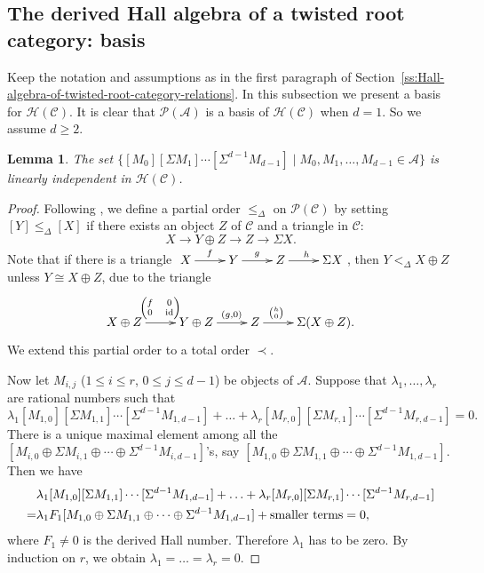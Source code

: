 \documentclass[reqno,12pt,a4paper]{amsart}
\newtheorem{lemma}[theorem]{Lemma}
\theoremstyle{remark}
\theoremstyle{definition}
\newcommand{\ca}{{\mathcal A}}
\newcommand{\cc}{{\mathcal C}}
\newcommand{\ch}{{\mathcal H}}
\newcommand{\cp}{{\mathcal P}}
\numberwithin{equation}{section}
\begin{document}
\subsection{The derived Hall algebra of a twisted root category: basis}
\label{ss:Hall-algebra-of-twisted-root-category-basis}
Keep the notation and assumptions as in the first paragraph of Section~\ref{ss:Hall-algebra-of-twisted-root-category-relations}.
In this subsection we present a basis for $\ch(\cc)$. It is clear that $\cp(\ca)$ is a basis of $\ch(\cc)$ when $d=1$. So we assume $d\geq 2$.

\begin{lemma}
\label{lemma-Hall-alg-basis-1}
The set $\{[M_0][\Sigma M_1] \cdots [\Sigma^{d-1} M_{d-1}]\mid M_0,M_1,\ldots,M_{d-1}\in\ca\}$ is linearly independent in $\ch(\cc)$.
\end{lemma}
\begin{proof} Following \cite{JensenSuZimmermann05}, we define a partial order $\leq_{\Delta}$ on $\mathcal{P(C)}$ by setting $[Y]\leq_{\Delta}[X]$ if there exists an object $Z$ of $\mathcal{C}$ and a triangle in $\mathcal{C}$:
\[X\rightarrow Y\oplus Z \rightarrow Z\rightarrow \Sigma X. \]
Note that if there is a triangle $\xymatrix@R=0.7pc{X\ar[r]^f & Y\ar[r]^g & Z\ar[r]^h & \Sigma X}$, then $Y<_{\Delta} X\oplus Z$ unless $Y\cong X\oplus Z$, due to the triangle
\[
\xymatrix{
X\oplus Z\ar[r]^{{\scriptsize\begin{pmatrix}f & 0\\ 0 & \mathrm{id}\end{pmatrix}}} & Y\oplus Z \ar[r]^(0.6){(g,0)} & Z\ar[r]^(0.3){{h\choose 0}} & \Sigma(X\oplus Z).
}
\]
We extend this partial order to a total order $\prec$.

Now let $M_{i,j}$ ($1\leq i\leq r$, $0\leq j\leq d-1$) be objects of $\mathcal{A}$. Suppose that $\lambda_1,\ldots, \lambda_r$ are rational numbers such that
\[\lambda_1 [M_{1,0}][\Sigma M_{1,1}]\cdots[\Sigma^{d-1} M_{1,d-1}]+\ldots +\lambda_r [M_{r,0}][\Sigma M_{r,1}]\cdots[\Sigma^{d-1} M_{r,d-1}]=0.\]
There is a unique maximal element among all the $[M_{i,0}\oplus\Sigma M_{i,1}\oplus \cdots \oplus \Sigma^{d-1}M_{i,d-1}]$'s, say $[M_{1,0}\oplus\Sigma M_{1,1}\oplus \cdots \oplus \Sigma^{d-1}M_{1,d-1}]$. Then we have
\begin{align*}
&\lambda_1 [M_{1,0}][\Sigma M_{1,1}]\cdots[\Sigma^{d-1} M_{1,d-1}]+\ldots +\lambda_r [M_{r,0}][\Sigma M_{r,1}]\cdots[\Sigma^{d-1} M_{r,d-1}]\\
=&\lambda_1 F_1 [M_{1,0}\oplus\Sigma M_{1,1}\oplus \cdots \oplus \Sigma^{d-1}M_{1,d-1}]+\hbox{smaller terms}=0,
\end{align*}
where $F_1\neq 0$ is the derived Hall number. Therefore $\lambda_1$ has to be zero. By induction on $r$, we obtain $\lambda_1=\ldots =\lambda_r=0$.
\end{proof}
\end{document}
